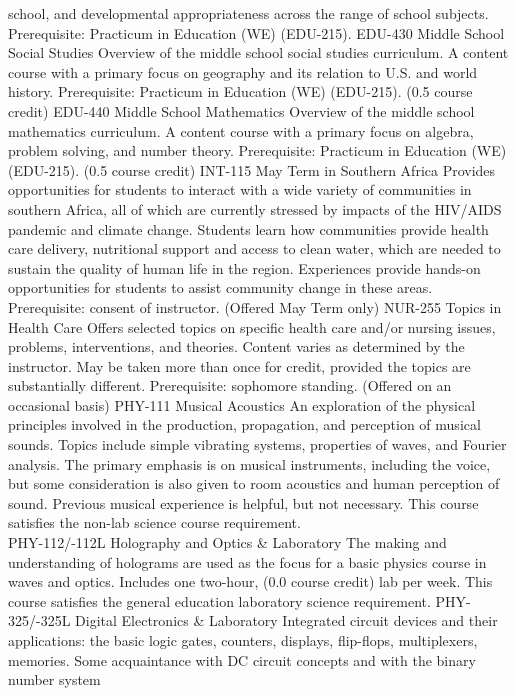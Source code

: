 \documentclass[
  letterpaper,
]{scrbook}
\begin{document}
school, and developmental appropriateness across the range of school
subjects. Prerequisite: Practicum in Education (WE) (EDU-215). EDU-430
Middle School Social Studies Overview of the middle school social
studies curriculum. A content course with a primary focus on geography
and its relation to U.S. and world history. Prerequisite: Practicum in
Education (WE) (EDU-215). (0.5 course credit) EDU-440 Middle School
Mathematics Overview of the middle school mathematics curriculum. A
content course with a primary focus on algebra, problem solving, and
number theory. Prerequisite: Practicum in Education (WE) (EDU-215). (0.5
course credit) INT-115 May Term in Southern Africa Provides
opportunities for students to interact with a wide variety of
communities in southern Africa, all of which are currently stressed by
impacts of the HIV/AIDS pandemic and climate change. Students learn how
communities provide health care delivery, nutritional support and access
to clean water, which are needed to sustain the quality of human life in
the region. Experiences provide hands-on opportunities for students to
assist community change in these areas. Prerequisite: consent of
instructor. (Offered May Term only) NUR-255 Topics in Health Care Offers
selected topics on specific health care and/or nursing issues, problems,
interventions, and theories. Content varies as determined by the
instructor. May be taken more than once for credit, provided the topics
are substantially different. Prerequisite: sophomore standing. (Offered
on an occasional basis) PHY-111 Musical Acoustics An exploration of the
physical principles involved in the production, propagation, and
perception of musical sounds. Topics include simple vibrating systems,
properties of waves, and Fourier analysis. The primary emphasis is on
musical instruments, including the voice, but some consideration is also
given to room acoustics and human perception of sound. Previous musical
experience is helpful, but not necessary. This course satisfies the
non-lab science course requirement.\\
PHY-112/-112L Holography and Optics \& Laboratory The making and
understanding of holograms are used as the focus for a basic physics
course in waves and optics. Includes one two-hour, (0.0 course credit)
lab per week. This course satisfies the general education laboratory
science requirement. PHY-325/-325L Digital Electronics \& Laboratory
Integrated circuit devices and their applications: the basic logic
gates, counters, displays, flip-flops, multiplexers, memories. Some
acquaintance with DC circuit concepts and with the binary number system
\end{document}
